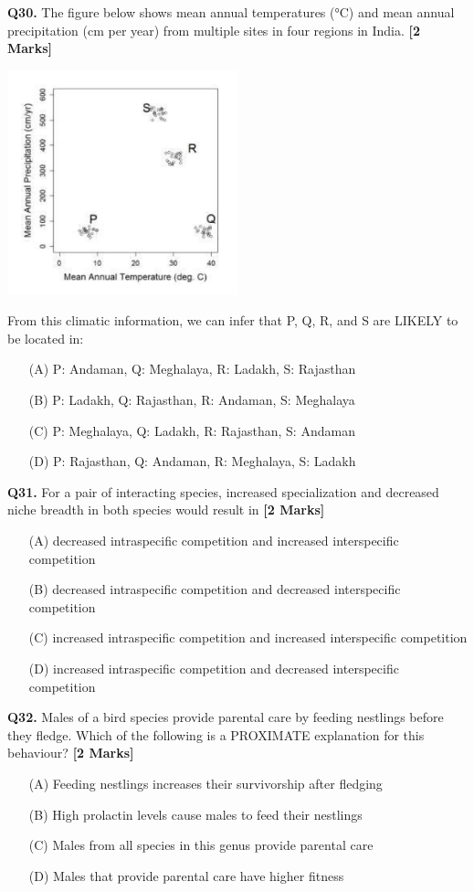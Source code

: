\documentclass[11pt]{article}
\newcommand{\questionb}[2]{
    \noindent\textbf{Q#2.} #1 \hfill \textbf{[2 Marks]}
}
\begin{document}
\questionb{The figure below shows mean annual temperatures (°C) and mean annual precipitation (cm per year) from multiple sites in four regions in India.}{30}
\begin{center}
\includegraphics[width=0.5\textwidth]{figures/30}
\end{center}
From this climatic information, we can infer that P, Q, R, and S are LIKELY to be located in:
\begin{enumerate}
    \item[(A)] P: Andaman, Q: Meghalaya, R: Ladakh, S: Rajasthan
    \item[(B)] P: Ladakh, Q: Rajasthan, R: Andaman, S: Meghalaya
    \item[(C)] P: Meghalaya, Q: Ladakh, R: Rajasthan, S: Andaman
    \item[(D)] P: Rajasthan, Q: Andaman, R: Meghalaya, S: Ladakh
\end{enumerate}
\vspace{0.5cm}

\questionb{For a pair of interacting species, increased specialization and decreased niche breadth in both species would result in}{31}
\begin{enumerate}
    \item[(A)] decreased intraspecific competition and increased interspecific competition
    \item[(B)] decreased intraspecific competition and decreased interspecific competition
    \item[(C)] increased intraspecific competition and increased interspecific competition
    \item[(D)] increased intraspecific competition and decreased interspecific competition
\end{enumerate}
\vspace{0.5cm}

\questionb{Males of a bird species provide parental care by feeding nestlings before they fledge. Which of the following is a PROXIMATE explanation for this behaviour?}{32}
\begin{enumerate}
    \item[(A)] Feeding nestlings increases their survivorship after fledging
    \item[(B)] High prolactin levels cause males to feed their nestlings
    \item[(C)] Males from all species in this genus provide parental care
    \item[(D)] Males that provide parental care have higher fitness
\end{enumerate}
\vspace{0.5cm}
\end{document}
